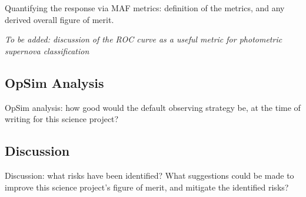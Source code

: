 Quantifying the response via MAF metrics: definition of the metrics,
and any derived overall figure of merit.

\emph{To be added: discussion of the ROC curve as a useful metric for photometric supernova 
classification}


\subsection{OpSim Analysis}
\label{sec:keyword:analysis}

OpSim analysis: how good would the default observing strategy be, at
the time of writing for this science project?



\subsection{Discussion}
\label{sec:keyword:discussion}

Discussion: what risks have been identified? What suggestions could be
made to improve this science project's figure of merit, and mitigate
the identified risks?



\navigationbar
